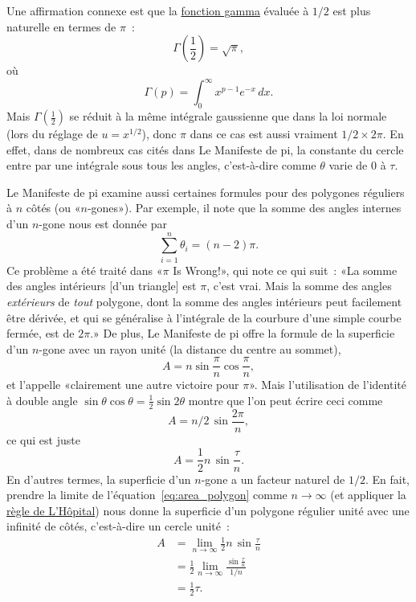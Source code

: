 Une affirmation connexe est que la
\href{https://fr.wikipedia.org/wiki/Fonction_gamma}{fonction gamma} évaluée à
$1/2$ est plus naturelle en termes de $\pi$~:
\[
\Gamma(\textstyle{\frac{1}{2}}) = \sqrt{\pi},
\]
où
\begin{equation}
\label{eq:gamma}
\Gamma(p) = \int_{0}^{\infty} x^{p-1} e^{-x}\,dx.
\end{equation}
Mais $\Gamma(\frac{1}{2})$ se réduit à la même intégrale gaussienne que dans la
loi normale (lors du réglage de $u = x^{1/2}$), donc $\pi$ dans ce cas est aussi
vraiment $1/2\times 2\pi$. En effet, dans de nombreux cas cités dans Le
Manifeste de pi, la constante du cercle entre par une intégrale sous tous les
angles, c'est-à-dire comme $\theta$ varie de $0$ à $\tau$.

Le Manifeste de pi examine aussi certaines formules pour des polygones réguliers
à $n$ côtés (ou «\ns $n$-gones\ns »). Par exemple, il note que la somme des angles
internes d'un $n$-gone nous est donnée par
\[
\sum_{i=1}^n \theta_i=(n-2)\pi.
\]
Ce problème a été traité dans «\ns $\pi$ Is Wrong!\ns », qui note ce qui suit~:
«\ns La somme des angles intérieurs [d'un triangle] est $\pi$, c'est vrai. Mais la
somme des angles \emph{extérieurs} de \emph{tout} polygone, dont la somme des
angles intérieurs peut facilement être dérivée, et qui se généralise à
l'intégrale de la courbure d'une simple courbe fermée, est de $2\pi$.\ns » De
plus, Le Manifeste de pi offre la formule de la superficie d'un $n$-gone avec un
rayon unité (la distance du centre au sommet),
\[ A=n\sin\frac{\pi}{n}\cos\frac{\pi}{n}, \]
et l'appelle «\ns clairement\textellipsis{} une autre victoire pour $\pi$\ns ». Mais
l'utilisation de l'identité à double angle $\sin\theta\cos\theta =
\frac{1}{2}\sin2\theta$ montre que l'on peut écrire ceci comme
\[ A = n/2\, \sin\frac{2\pi}{n}, \]
ce qui est juste
\begin{equation}
\label{eq:area_polygon}
A = \frac{1}{2} n\, \sin\frac{\tau}{n}.
\end{equation}
En d'autres termes, la superficie d'un $n$-gone a un facteur
naturel de $1/2$. En fait, prendre la limite de
l'équation~\eqref{eq:area_polygon} comme $n\rightarrow \infty$ (et appliquer la
\href{https://fr.wikipedia.org/wiki/R%C3%A8gle_de_L%27H%C3%B4pital}{règle de
L'Hôpital}) nous donne la superficie d'un polygone régulier unité avec une infinité
de côtés, c'est-à-dire un cercle unité~:
\begin{equation}
\label{eq:lhopital}
\begin{split}
A & = \lim_{n\rightarrow\infty} \frac{1}{2} n\, \sin\frac{\tau}{n} \\
  & = \frac{1}{2} \lim_{n\rightarrow\infty} \frac{\sin\frac{\tau}{n}}{1/n} \\
  & = \tfrac{1}{2}\tau.
\end{split}
\end{equation}

